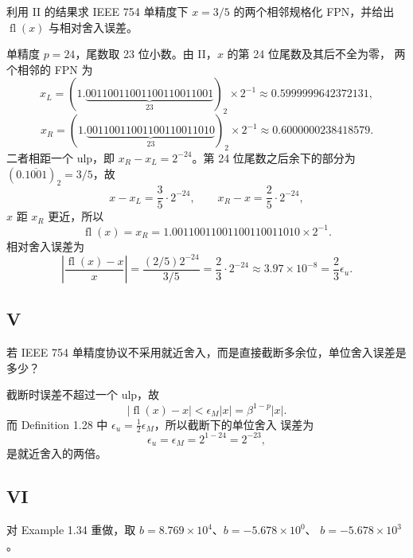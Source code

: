 \documentclass{article}
\newcommand{\fl}{\operatorname{fl}}
\begin{document}
利用 II 的结果求 IEEE 754 单精度下 $x = 3/5$ 的两个相邻规格化 FPN，并给出 $\fl(x)$
与相对舍入误差。

\begin{solution}
  单精度 $p = 24$，尾数取 23 位小数。由 II，$x$ 的第 24 位尾数及其后不全为零，
  两个相邻的 FPN 为
  \[
    x_L = (1.\underbrace{00110011001100110011001}_{23})_2 \times 2^{-1}
        \approx 0.5999999642372131,
  \]
  \[
    x_R = (1.\underbrace{00110011001100110011010}_{23})_2 \times 2^{-1}
        \approx 0.6000000238418579.
  \]
  二者相距一个 ulp，即 $x_R - x_L = 2^{-24}$。第 24 位尾数之后余下的部分为
  $(0.\overline{1001})_2 = 3/5$，故
  \[
    x - x_L = \frac{3}{5} \cdot 2^{-24}, \qquad
    x_R - x = \frac{2}{5} \cdot 2^{-24},
  \]
  $x$ 距 $x_R$ 更近，所以
  \[
    \fl(x) = x_R = 1.00110011001100110011010 \times 2^{-1}.
  \]
  相对舍入误差为
  \[
    \left| \frac{\fl(x) - x}{x} \right|
    = \frac{(2/5)2^{-24}}{3/5}
    = \frac{2}{3} \cdot 2^{-24}
    \approx 3.97 \times 10^{-8}
    = \frac{2}{3}\epsilon_u.
  \]
\end{solution}

\subsection*{V}

若 IEEE 754 单精度协议不采用就近舍入，而是直接截断多余位，单位舍入误差是多少？

\begin{solution}
  截断时误差不超过一个 ulp，故
  \[
    |\fl(x) - x| < \epsilon_M |x| = \beta^{1-p} |x|.
  \]
  而 Definition 1.28 中 $\epsilon_u = \tfrac{1}{2}\epsilon_M$，所以截断下的单位舍入
  误差为
  \[
    \epsilon_u = \epsilon_M = 2^{1-24} = 2^{-23},
  \]
  是就近舍入的两倍。
\end{solution}

\subsection*{VI}

对 Example 1.34 重做，取 $b = 8.769 \times 10^{4}$、$b = -5.678 \times 10^{0}$、
$b = -5.678 \times 10^{3}$。
\end{document}
